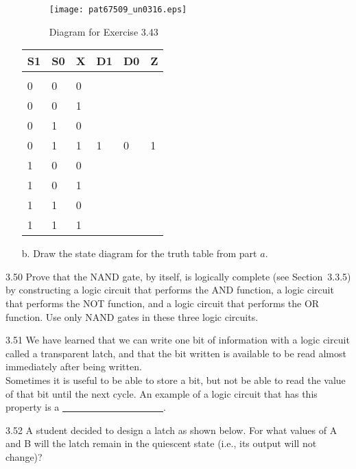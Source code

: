 \documentclass{patt}
\begin{document}
\begin{exercises}
\begin{enumerate}[b.]
\begin{figure}[h]
\centerline{\texttt{[image: pat67509\_un0316.eps]}}
\caption{Diagram for Exercise 3.43}
\vspace{-12pt}
\end{figure}

\begin{inlinetable}
\begin{tabular}{@{}lll|lll@{}}
\hline
\rule{0pt}{10pt}S1\rule{0pt}{10pt} & S0 & X & D1 & D0 & Z\\
\hline\\[-7pt]
0 & 0 & 0\\[2.6pt]
0 & 0 & 1\\[2.6pt]
0 & 1 & 0\\[2.6pt]
0 & 1 & 1 & 1 & 0 & 1\\[2.6pt]
1 & 0 & 0\\[2.6pt]
1 & 0 & 1\\[2.6pt]
1 & 1 & 0\\[2.6pt]
1 & 1 & 1\\
\hline
\end{tabular}
\end{inlinetable}

\item[b.] Draw the state diagram for the truth table from part $a$.
\end{enumerate}

\item[3.50] Prove that the NAND gate, by itself, is logically complete
  (see Section~3.3.5) by constructing a logic circuit that performs
  the AND function, a logic circuit that performs the NOT function,
  and a logic circuit that performs the OR function. Use only NAND
  gates in these three logic circuits.

\item[3.51] We have learned that we can write one bit of information 
  with a logic circuit called a transparent latch, and that the bit 
  written is available to be read almost immediately
  after being written.\\
  Sometimes it is useful to be able to store a bit, but not be able to
  read the value of that bit until the next cycle.  
  An example of a logic circuit that has this 
  property is a \underline{~~~~~~~~~~~~~~~~~~~~~}.   

\newpage

\item[3.52] A student decided to design a latch as
shown below.  For what values of A and B will the latch remain in the
quiescent state (i.e., its output will not change)?


\end{exercises}
\end{document}
